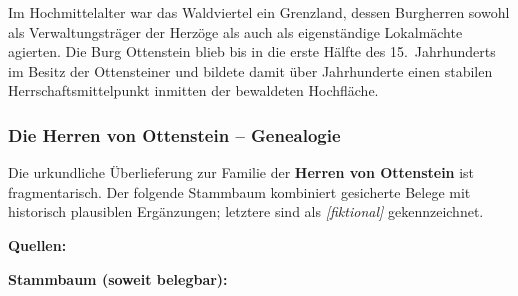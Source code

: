 Im Hochmittelalter war das Waldviertel ein Grenzland, dessen Burgherren sowohl als Verwaltungsträger der Herzöge als auch als eigenständige Lokalmächte agierten. Die Burg Ottenstein blieb bis in die erste Hälfte des 15.~Jahrhunderts im Besitz der Ottensteiner und bildete damit über Jahrhunderte einen stabilen Herrschaftsmittelpunkt inmitten der bewaldeten Hochfläche. \cite{reichhalter_kuehtreiber,noe_burgen_online_ottenstein}

\subsubsection{Die Herren von Ottenstein -- Genealogie}\label{herren_von_ottenstein}

Die urkundliche Überlieferung zur Familie der \textbf{Herren von Ottenstein} ist fragmentarisch. Der folgende Stammbaum kombiniert gesicherte Belege mit historisch plausiblen Ergänzungen; letztere sind als \textit{[fiktional]} gekennzeichnet.

\medskip
\noindent\textbf{Quellen:} \cite{noe_burgen_online_ottenstein,reichhalter_kuehtreiber,schneider_ottenstein,burgen_austria_ottenstein}

\medskip
\noindent\textbf{Stammbaum (soweit belegbar):}

